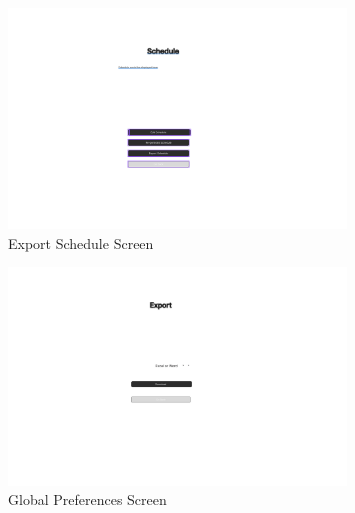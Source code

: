 \documentclass{article}
\begin{document}
\begin{figure}[h]
    \centering
    \includegraphics[width=0.8\textwidth]{photos/photo6.png}
    \caption{Export Schedule Screen}
\end{figure}

\begin{figure}[h]
    \centering
    \includegraphics[width=0.8\textwidth]{photos/photo7.png}
    \caption{Global Preferences Screen}
\end{figure}
\end{document}
